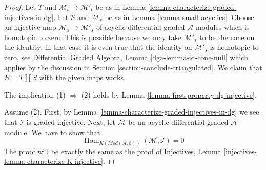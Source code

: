 \documentclass[10pt,a4paper]{amsart}
\theoremstyle{plain}
\theoremstyle{definition}
\theoremstyle{remark}
\numberwithin{equation}{subsection}
\def\Hom{\mathop{\mathrm{Hom}}\nolimits}
\begin{document}
\begin{proof}
Let $T$ and $\mathcal{M}_t \to \mathcal{M}'_t$ be as in
Lemma \ref{lemma-characterize-graded-injectives-in-dg}.
Let $S$ and $\mathcal{M}_s$ be as in
Lemma \ref{lemma-small-acyclics}.
Choose an injective map $\mathcal{M}_s \to \mathcal{M}'_s$
of acyclic differential graded $\mathcal{A}$-modules
which is homotopic to zero. This is possible because we
may take $\mathcal{M}'_s$ to be the cone on the identity;
in that case it is even true that the identity on
$\mathcal{M}'_s$ is homotopic to zero, see
Differential Graded Algebra, Lemma \ref{dga-lemma-id-cone-null} which
applies by the discussion in Section \ref{section-conclude-triangulated}.
We claim that $R = T \coprod S$ with the given maps works.

\medskip\noindent
The implication (1) $\Rightarrow$ (2) holds by
Lemma \ref{lemma-first-property-dg-injective}.

\medskip\noindent
Assume (2). First, by Lemma \ref{lemma-characterize-graded-injectives-in-dg}
we see that $\mathcal{I}$ is graded injective. Next, let
$\mathcal{M}$ be an acyclic differential graded $\mathcal{A}$-module.
We have to show that
$$
\Hom_{K(\textit{Mod}(\mathcal{A}, \text{d}))}(\mathcal{M}, \mathcal{I}) = 0
$$
The proof will be exactly the same as the proof of
Injectives, Lemma \ref{injectives-lemma-characterize-K-injective}.


\end{proof}
\end{document}
